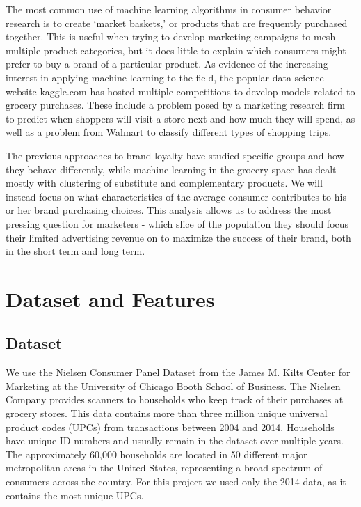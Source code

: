 \documentclass[conference]{IEEEtran}
\begin{document}
The most common use of machine learning algorithms in consumer behavior research is to create ‘market baskets,’ or products that are frequently purchased together\cite{mcauley2015inferring}. This is useful when trying to develop marketing campaigns to mesh multiple product categories, but it does little to explain which consumers might prefer to buy a brand of a particular product. As evidence of the increasing interest in applying machine learning to the field, the popular data science website kaggle.com has hosted multiple competitions to develop models related to grocery purchases\cite{kaggleDunn}\cite{kaggleWalmart}. These include a problem posed by a marketing research firm to predict when shoppers will visit a store next and how much they will spend, as well as a problem from Walmart to classify different types of shopping trips.


The previous approaches to brand loyalty have studied specific groups and how they behave differently, while machine learning in the grocery space has dealt mostly with clustering of substitute and complementary products. We will instead focus on what characteristics of the average consumer contributes to his or her brand purchasing choices. This analysis allows us to address the most pressing question for marketers - which slice of the population they should focus their limited advertising revenue on to maximize the success of their brand, both in the short term and long term\cite{witten2005data}.

\section{Dataset and Features}

\subsection{Dataset}
We use the Nielsen Consumer Panel Dataset from the James M. Kilts Center for Marketing at the University of Chicago Booth School of Business. The Nielsen Company provides scanners to households who keep track of their purchases at grocery stores. This data contains more than three million unique universal product codes (UPCs) from transactions between 2004 and 2014. Households have unique ID numbers and usually remain in the dataset over multiple years. The approximately 60,000 households are located in 50 different major metropolitan areas in the United States, representing a broad spectrum of consumers across the country. For this project we used only the 2014 data, as it contains the most unique UPCs.
\end{document}
